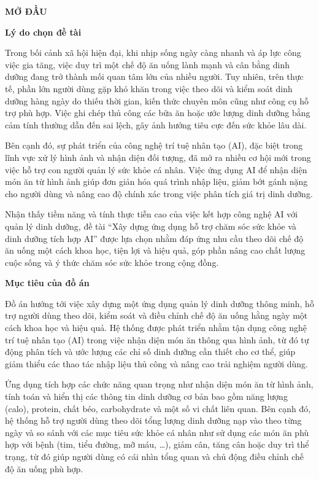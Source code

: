 \documentclass[../main.tex]{subfiles}
\begin{document}
\begin{center}
    {\large \textbf{MỞ ĐẦU}}
\end{center}
\vspace{0.4cm}

\noindent\textbf{Lý do chọn đề tài}

Trong bối cảnh xã hội hiện đại, khi nhịp sống ngày càng nhanh và áp lực công việc gia tăng, việc duy trì một chế độ ăn uống lành mạnh và cân bằng dinh dưỡng đang trở thành mối quan tâm lớn của nhiều người. Tuy nhiên, trên thực tế, phần lớn người dùng gặp khó khăn trong việc theo dõi và kiểm soát dinh dưỡng hàng ngày do thiếu thời gian, kiến thức chuyên môn cũng như công cụ hỗ trợ phù hợp. Việc ghi chép thủ công các bữa ăn hoặc ước lượng dinh dưỡng bằng cảm tính thường dẫn đến sai lệch, gây ảnh hưởng tiêu cực đến sức khỏe lâu dài.

Bên cạnh đó, sự phát triển của công nghệ trí tuệ nhân tạo (AI), đặc biệt trong lĩnh vực xử lý hình ảnh và nhận diện đối tượng, đã mở ra nhiều cơ hội mới trong việc hỗ trợ con người quản lý sức khỏe cá nhân. Việc ứng dụng AI để nhận diện món ăn từ hình ảnh giúp đơn giản hóa quá trình nhập liệu, giảm bớt gánh nặng cho người dùng và nâng cao độ chính xác trong việc phân tích giá trị dinh dưỡng.

Nhận thấy tiềm năng và tính thực tiễn cao của việc kết hợp công nghệ AI với quản lý dinh dưỡng, đề tài ``Xây dựng ứng dụng hỗ trợ chăm sóc sức khỏe và dinh dưỡng tích hợp AI'' được lựa chọn nhằm đáp ứng nhu cầu theo dõi chế độ ăn uống một cách khoa học, tiện lợi và hiệu quả, góp phần nâng cao chất lượng cuộc sống và ý thức chăm sóc sức khỏe trong cộng đồng.

\vspace{0.3cm}
\noindent\textbf{Mục tiêu của đồ án}

Đồ án hướng tới việc xây dựng một ứng dụng quản lý dinh dưỡng thông minh, hỗ trợ người dùng theo dõi, kiểm soát và điều chỉnh chế độ ăn uống hằng ngày một cách khoa học và hiệu quả. Hệ thống được phát triển nhằm tận dụng công nghệ trí tuệ nhân tạo (AI) trong việc nhận diện món ăn thông qua hình ảnh, từ đó tự động phân tích và ước lượng các chỉ số dinh dưỡng cần thiết cho cơ thể, giúp giảm thiểu các thao tác nhập liệu thủ công và nâng cao trải nghiệm người dùng.

Ứng dụng tích hợp các chức năng quan trọng như nhận diện món ăn từ hình ảnh, tính toán và hiển thị các thông tin dinh dưỡng cơ bản bao gồm năng lượng (calo), protein, chất béo, carbohydrate và một số vi chất liên quan. Bên cạnh đó, hệ thống hỗ trợ người dùng theo dõi tổng lượng dinh dưỡng nạp vào theo từng ngày và so sánh với các mục tiêu sức khỏe cá nhân như sử dụng các món ăn phù hợp với bệnh (tim, tiểu đường, mỡ máu, \dots), giảm cân, tăng cân hoặc duy trì thể trạng, từ đó giúp người dùng có cái nhìn tổng quan và chủ động điều chỉnh chế độ ăn uống phù hợp.
\end{document}
